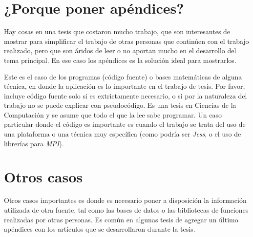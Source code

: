\section{¿Porque poner apéndices?}

Hay cosas en una tesis que costaron mucho trabajo, que son
interesantes de mostrar para simplificar el trabajo de otras
personas que continúen con el trabajo realizado, pero que son áridos
de leer o no aportan mucho en el desarrollo del tema principal. En
ese caso los apéndices es la solución ideal para mostrarlos.

Este es el caso de los programas (código fuente) o bases matemáticas
de alguna técnica, en donde la aplicación es lo importante en el
trabajo de tesis. Por favor, incluye código fuente solo si es
extrictamente necesario, o si por la naturaleza del trabajo no se
puede
explicar con pseudocódigo. Es una tesis en Ciencias de la Computación
y se asume que todo el que la lee sabe programar. Un caso particular
donde el código es importante es cuando el trabajo se trata del uso de
una plataforma o una técnica muy específica (como podría ser
\emph{Jess}, o el uso de librerías para \emph{MPI}).

\section{Otros casos}

Otros casos importantes es donde es necesario poner a disposición la
información utilizada de otra fuente, tal como las bases de datos o
las bibliotecas de funciones realizadas por otras personas. Es común
en algunas tesis de agregar un último apéndices con los artículos
que se desarrollaron durante la tesis.
